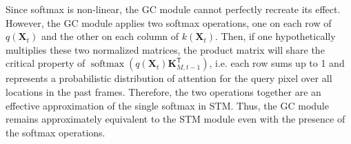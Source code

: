 \documentclass[runningheads]{llncs}
\begin{document}
Since softmax is non-linear, the GC module cannot perfectly recreate its effect. However, the GC module applies two softmax operations, one on each row of $q(\bm{X}_t)$ and the other on each column of $k(\bm{X}_t)$. Then, if one hypothetically multiplies these two normalized matrices, the product matrix will share the critical property of $\operatorname{softmax}(q(\bm{X}_t)\bm{K}^\mathsf{T}_{M, t - 1})$, i.e. each row sums up to 1 and represents a probabilistic distribution of attention for the query pixel over all locations in the past frames. Therefore, the two operations together are an effective approximation of the single softmax in STM. Thus, the GC module remains approximately equivalent to the STM module even with the presence of the softmax operations. 
\end{document}
